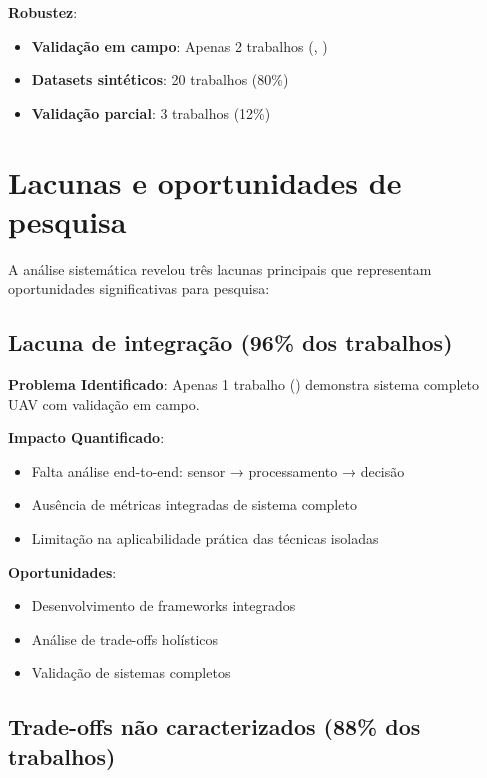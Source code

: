 \textbf{Robustez}:
\begin{itemize}
    \item \textbf{Validação em campo}: Apenas 2 trabalhos (\textcite{Shin2020}, \textcite{Diaz2019})
    \item \textbf{Datasets sintéticos}: 20 trabalhos (80\%)
    \item \textbf{Validação parcial}: 3 trabalhos (12\%)
\end{itemize}

\section{Lacunas e oportunidades de pesquisa}\label{sec:lacunas_oportunidades}

A análise sistemática revelou três lacunas principais que representam oportunidades significativas para pesquisa:

\subsection{Lacuna de integração (96\% dos trabalhos)}\label{subsec:lacuna_integracao}

\textbf{Problema Identificado}: Apenas 1 trabalho (\textcite{Shin2020}) demonstra sistema completo UAV com validação em campo.

\textbf{Impacto Quantificado}:
\begin{itemize}
    \item Falta análise end-to-end: sensor → processamento → decisão
    \item Ausência de métricas integradas de sistema completo
    \item Limitação na aplicabilidade prática das técnicas isoladas
\end{itemize}

\textbf{Oportunidades}:
\begin{itemize}
    \item Desenvolvimento de frameworks integrados
    \item Análise de trade-offs holísticos
    \item Validação de sistemas completos
\end{itemize}

\subsection{Trade-offs não caracterizados (88\% dos trabalhos)}\label{subsec:tradeoffs_nao_caracterizados}

